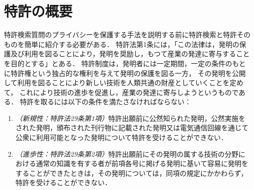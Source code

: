 \documentclass[master]{suribt}
\theoremstyle{definition}
\begin{document}
 \chapter{特許の概要}
 特許検索質問のプライバシーを保護する手法を説明する前に特許検索と特許そのものを簡単に紹介する必要がある．
 特許法第1条には，「この法律は，発明の保護及び利用を図ることにより，発明を奨励し，もつて産業の発達に寄与することを目的とする」とある．
 特許制度は，発明者には一定期間，一定の条件のもとに特許権という独占的な権利を与えて発明の保護を図る一方，
 その発明を公開して利用を図ることにより新しい技術を人類共通の財産としていくことを定めて，
 これにより技術の進歩を促進し，産業の発達に寄与しようというものである．
 特許を取るには以下の条件を満たさなければならない：
 \begin{enumerate}
 \item {\em （新規性：特許法29条第1項）}特許出願前に公然知られた発明，公然実施をされた発明，頒布された刊行物に記載された発明又は電気通信回線を通じて公衆に利用可能となった発明について特許を受けることができない．
 \item {\em （進歩性：特許法29条第2項）}特許出願前にその発明の属する技術の分野における通常の知識を有する者が前項各号に掲げる発明に基いて容易に発明をすることができたときは，その発明については，同項の規定にかかわらず，特許を受けることができない．
 \end{enumerate}
\end{document}
